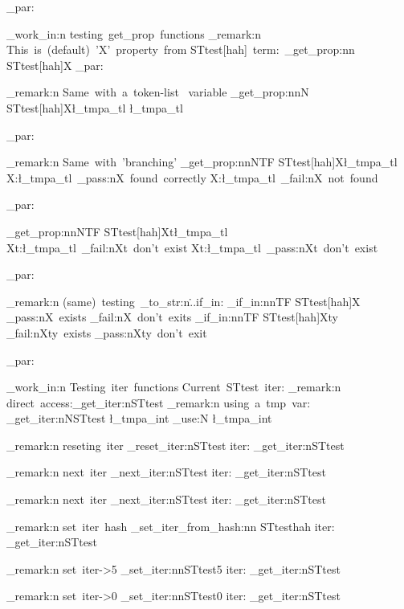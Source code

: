 \documentclass{article}
\begin{document}



\sttests_par:

  
  
\sttests_work_in:n {testing~get_prop~functions}
\sttests_remark:n {This~is~(default)~'X'~property~from STtest[hah]~term:~}\starray_get_prop:nn {STtest[hah]}{X}
\sttests_par:


\sttests_remark:n {Same~with~a~token-list~ variable}
\starray_get_prop:nnN {STtest[hah]}{X}\l_tmpa_tl
\l_tmpa_tl

\sttests_par:

\sttests_remark:n {Same~with~'branching'}
\starray_get_prop:nnNTF {STtest[hah]}{X}\l_tmpa_tl
  {X:\l_tmpa_tl~\sttests_pass:n{X~found~correctly}}
  {X:\l_tmpa_tl~\sttests_fail:n{X~not~found}}

\sttests_par:

\starray_get_prop:nnNTF {STtest[hah]}{Xt}\l_tmpa_tl
  {Xt:\l_tmpa_tl~\sttests_fail:n{Xt~don't~exist}}
  {Xt:\l_tmpa_tl~\sttests_pass:n{Xt~don't~exist}}

\sttests_par:

\sttests_remark:n {(same)~testing~\tl_to_str:n{\...if_in:}}
\starray_if_in:nnTF {STtest[hah]}{X}
  {\sttests_pass:n{X~exists}}
  {\sttests_fail:n{X~don't~exits}}
\starray_if_in:nnTF {STtest[hah]}{Xty}
  {\sttests_fail:n{Xty~exists}}
  {\sttests_pass:n{Xty~don't~exit}}

 
\sttests_par:


\sttests_work_in:n {Testing~iter~functions}
Current~STtest~iter: 
\sttests_remark:n {direct~access:\starray_get_iter:n{STtest}}
\sttests_remark:n {using~a~tmp~var: \starray_get_iter:nN{STtest} \l_tmpa_int \int_use:N \l_tmpa_int}

\sttests_remark:n {reseting~iter} \starray_reset_iter:n{STtest}
iter: \starray_get_iter:n{STtest}

\sttests_remark:n {next~iter} \starray_next_iter:n{STtest}
iter: \starray_get_iter:n{STtest}

\sttests_remark:n {next~iter} \starray_next_iter:n{STtest}
iter: \starray_get_iter:n{STtest}


\sttests_remark:n {set~iter~hash} \starray_set_iter_from_hash:nn {STtest}{hah}
iter: \starray_get_iter:n{STtest}


\sttests_remark:n {set~iter->5} \starray_set_iter:nn{STtest}{5}
iter: \starray_get_iter:n{STtest}

\sttests_remark:n {set~iter->0} \starray_set_iter:nn{STtest}{0}
iter: \starray_get_iter:n{STtest}
\end{document}
